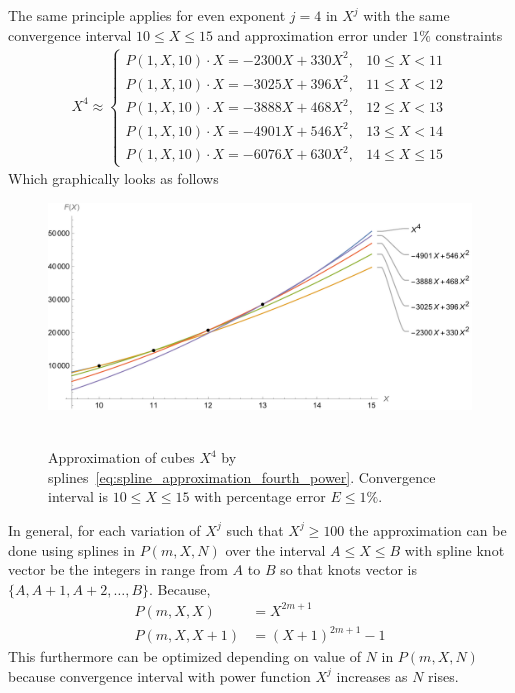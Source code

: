 The same principle applies for even exponent $j=4$ in $X^j$ with the same convergence interval $10 \leq X \leq 15$
and approximation error under $1\%$ constraints
\begin{align}
    X^4 \approx
    \begin{cases}
        P(1,X,10) \cdot X = -2300X + 330X^2, & 10 \leq X < 11 \\
        P(1,X,10) \cdot X = -3025X + 396X^2, & 11 \leq X < 12 \\
        P(1,X,10) \cdot X = -3888X + 468X^2, & 12 \leq X < 13 \\
        P(1,X,10) \cdot X = -4901X + 546X^2, & 13 \leq X < 14 \\
        P(1,X,10) \cdot X = -6076X + 630X^2, & 14 \leq X \leq 15
    \end{cases}
    \label{eq:spline_approximation_fourth_power}
\end{align}
Which graphically looks as follows
\begin{figure}[H]
    \centering
    \includegraphics[width=1\textwidth]{sections/images/09_plots_of_fourth_power_with_p_2_10_15_times_x}
    ~\caption{
        Approximation of cubes $X^4$ by splines~\eqref{eq:spline_approximation_fourth_power}.
        Convergence interval is $10 \leq X \leq 15$ with percentage error $E\leq 1\%$.
    }
    \label{fig:09_plots_of_fourth_power_with_p_2_10_15_times_x}
\end{figure}
In general, for each variation of $X^j$ such that $X^j \geq 100$ the approximation can be done using
splines in $P(m,X, N)$ over the interval $A \leq X \leq B$ with spline knot vector be the integers in
range from $A$ to $B$ so that knots vector is $\{A, A+1, A+2, \ldots, B \}$.
Because,
\begin{align*}
    P(m,X, X) &= X^{2m+1} \\
    P(m,X, X+1) &= (X+1)^{2m+1} - 1
\end{align*}
This furthermore can be optimized depending on value of $N$ in $P(m,X,N)$ because convergence interval
with power function $X^j$ increases as $N$ rises.
